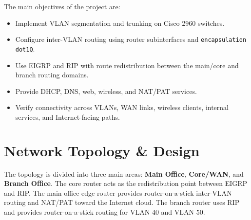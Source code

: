 \documentclass[12pt,a4paper]{article}
\begin{document}
The main objectives of the project are:
\begin{itemize}
    \item Implement VLAN segmentation and trunking on Cisco 2960 switches.
    \item Configure inter-VLAN routing using router subinterfaces and \texttt{encapsulation dot1Q}.
    \item Use EIGRP and RIP with route redistribution between the main/core and branch routing domains.
    \item Provide DHCP, DNS, web, wireless, and NAT/PAT services.
    \item Verify connectivity across VLANs, WAN links, wireless clients, internal services, and Internet-facing paths.
\end{itemize}

\section{Network Topology \& Design}

The topology is divided into three main areas: \textbf{Main Office}, \textbf{Core/WAN}, and \textbf{Branch Office}. The core router acts as the redistribution point between EIGRP and RIP. The main office edge router provides router-on-a-stick inter-VLAN routing and NAT/PAT toward the Internet cloud. The branch router uses RIP and provides router-on-a-stick routing for VLAN 40 and VLAN 50.
\end{document}
